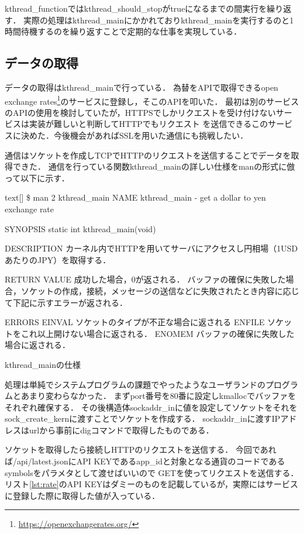kthread\_functionではkthread\_should\_stopがtrueになるまでの間実行を繰り返す．
実際の処理はkthread\_mainにかかれておりkthread\_mainを実行するのと1時間待機するのを繰り返すことで定期的な仕事を実現している．

\subsection{データの取得}
データの取得はkthread\_mainで行っている．
為替をAPIで取得できるopen exchange rates\footnote{\url{https://openexchangerates.org/}}のサービスに登録し，そこのAPIを叩いた．
最初は別のサービスのAPIの使用を検討していたが，HTTPSでしかリクエストを受け付けないサービスは実装が難しいと判断してHTTPでもリクエスト
を送信できるこのサービスに決めた．今後機会があればSSLを用いた通信にも挑戦したい．

通信はソケットを作成しTCPでHTTPのリクエストを送信することでデータを取得できた．
通信を行っている関数kthread\_mainの詳しい仕様をmanの形式に倣って以下に示す．
\begin{longlisting}
\begin{myminted}{text}[]
\$ man 2 kthread_main
NAME
       kthread_main - get a dollar to yen exchange rate

SYNOPSIS
       static int kthread_main(void)

DESCRIPTION
       カーネル内でHTTPを用いてサーバにアクセスし円相場（1USDあたりのJPY）を取得する．

RETURN VALUE
       成功した場合，0が返される．
       バッファの確保に失敗した場合，ソケットの作成，接続，メッセージの送信などに失敗されたとき内容に応じて下記に示すエラーが返される．

ERRORS
       EINVAL ソケットのタイプが不正な場合に返される
       ENFILE ソケットをこれ以上開けない場合に返される．
       ENOMEM バッファの確保に失敗した場合に返される．
\end{myminted}
\caption{kthread\_mainの仕様}
\label{lst:syscallspec}
\end{longlisting}

処理は単純でシステムプログラムの課題でやったようなユーザランドのプログラムとあまり変わらなかった．
まずport番号を80番に設定しkmallocでバッファをそれぞれ確保する．
その後構造体sockaddr\_inに値を設定してソケットをそれをsock\_create\_kernに渡すことでソケットを作成する．
sockaddr\_inに渡すIPアドレスはurlから事前にdigコマンドで取得したものである．

ソケットを取得したら接続しHTTPのリクエストを送信する．
今回であれば/api/latest.jsonにAPI KEYであるapp\_idと対象となる通貨のコードであるsymbolsをパラメタとして渡せばいい\cite{api}ので
GETを使ってリクエストを送信する．
リスト\ref{lst:rate}のAPI KEYはダミーのものを記載しているが，実際にはサービスに登録した際に取得した値が入っている．

